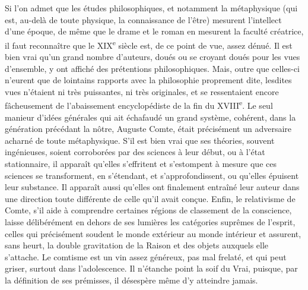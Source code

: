 \documentclass[french,twoside]{book} %
\newcommand\chaptercont{} %
\renewcommand\chaptercont{} %
\begin{document}
\chaptercont
\noindent Si l’on admet que les études philosophiques, et notamment la métaphysique (qui est, au-delà de toute physique, la connaissance de l’être) mesurent l’intellect d’une époque, de même que le drame et le roman en mesurent la faculté créatrice, il faut reconnaître que le XIX\textsuperscript{e} siècle est, de ce point de vue, assez dénué. Il est bien vrai qu’un grand nombre d’auteurs, doués ou se croyant doués pour les vues d’ensemble, y ont affiché des prétentions philosophiques. Mais, outre que celles-ci n’eurent que de lointains rapports avec la philosophie proprement dite, lesdites vues n’étaient ni très puissantes, ni très originales, et se ressentaient encore fâcheusement de l’abaissement encyclopédiste de la fin du XVIII\textsuperscript{e}. Le seul manieur d’idées générales qui ait échafaudé un grand système, cohérent, dans la génération précédant la nôtre, Auguste Comte, était précisément un adversaire acharné de toute métaphysique. S’il est bien vrai que ses théories, souvent ingénieuses, soient corroborées par des sciences à leur début, ou à l’état stationnaire, il apparaît qu’elles s’effritent et s’estompent à mesure que ces sciences se transforment, en s’étendant, et s’approfondissent, ou qu’elles épuisent leur substance. Il apparaît aussi qu’elles ont finalement entraîné leur auteur dans une direction toute différente de celle qu’il avait conçue. Enfin, le relativisme de Comte, s’il aide à comprendre certaines régions de classement de la conscience, laisse délibérément en dehors de ses lumières les catégories suprêmes de l’esprit, celles qui précisément soudent le monde extérieur au monde intérieur et assurent, sans heurt, la double gravitation de la Raison et des objets auxquels elle s’attache. Le comtisme est un vin assez généreux, pas mal frelaté, et qui peut griser, surtout dans l’adolescence. Il n’étanche point la soif du Vrai, puisque, par la définition de ses prémisses, il désespère même d’y atteindre jamais.\par
\end{document}
